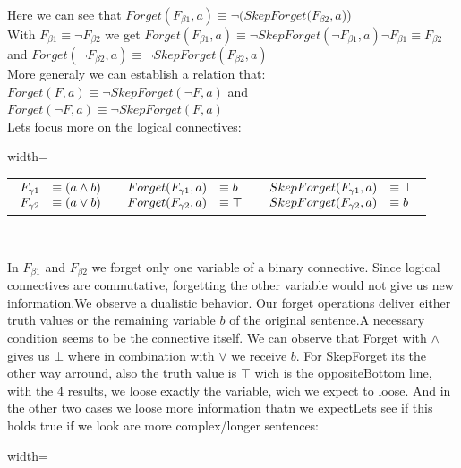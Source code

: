 Here we can see that $Forget(F_{\beta1},a) \equiv \neg(SkepForget(F_{\beta2},a$))\\With $F_{\beta1} \equiv \neg F_{\beta2}$ we get $Forget(F_{\beta1},a) \equiv \neg SkepForget(\neg F_{\beta1},a)$$\neg F_{\beta1} \equiv F_{\beta2}$ and $Forget(\neg F_{\beta2},a) \equiv \neg SkepForget(F_{\beta2},a)$\\More generaly we can establish a relation that: $Forget(F,a) \equiv \neg SkepForget(\neg F,a)$ and $Forget(\neg F,a) \equiv \neg SkepForget(F,a)$\\Lets focus more on the logical connectives:\\\begin{adjustbox}{width=\textwidth}
\begin{tabular}{| c | c | c |}
 &  &  \\
\hline
$\begin{array}{l l}
F_{\gamma1} &\equiv (a \land b)\\
F_{\gamma2} &\equiv (a \lor b)\\
\end{array}$ & $\begin{array}{l l}
Forget(F_{\gamma1},a) &\equiv b\\
Forget(F_{\gamma2},a) &\equiv \top\\
\end{array}$ & $\begin{array}{l l}
SkepForget(F_{\gamma1},a) &\equiv \bot\\
SkepForget(F_{\gamma2},a) &\equiv b\\
\end{array}$\\
\end{tabular}\
\end{adjustbox}\newline\newline
In $F_{\beta1}$ and $F_{\beta2}$ we forget only one variable of a binary connective. Since logical connectives are commutative, forgetting the other variable would not give us new information.We observe a dualistic behavior. Our forget operations deliver either truth values or the remaining variable $b$ of the original sentence.A necessary condition seems to be the connective itself. We can observe that Forget with $\land$ gives us $\bot$ where in combination with $\lor$ we receive $b$. For SkepForget its the other way arround, also the truth value is $\top$ wich is the oppositeBottom line, with the 4 results, we loose exactly the variable, wich we expect to loose. And in the other two cases we loose more information thatn we expectLets see if this holds true if we look are more complex/longer sentences:\\\begin{adjustbox}{width=\textwidth}

\end{adjustbox}$$
